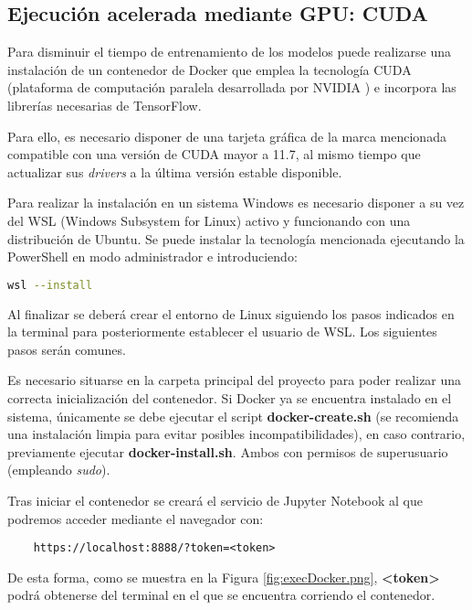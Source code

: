 
\subsection{Ejecución acelerada mediante GPU: CUDA}
Para disminuir el tiempo de entrenamiento de los modelos puede realizarse una instalación de un contenedor de Docker que emplea la tecnología
CUDA (plataforma de computación paralela desarrollada por NVIDIA \cite{misc:wikiCuda}) e incorpora las librerías necesarias de TensorFlow.

Para ello, es necesario disponer de una tarjeta gráfica de la marca mencionada compatible con una versión de CUDA mayor a 11.7, al mismo tiempo
que actualizar sus \textit{drivers} a la última versión estable disponible.

Para realizar la instalación en un sistema Windows es necesario disponer a su vez del WSL (Windows Subsystem for Linux) activo y funcionando con una distribución
de Ubuntu.
Se puede instalar la tecnología mencionada ejecutando la PowerShell en modo administrador e introduciendo:
\begin{lstlisting}[language=Bash]
    wsl --install
\end{lstlisting}

Al finalizar se deberá crear el entorno de Linux siguiendo los pasos indicados en la terminal para posteriormente establecer el usuario
de WSL.
Los siguientes pasos serán comunes.

Es necesario situarse en la carpeta principal del proyecto para poder realizar una correcta inicialización del contenedor. 
Si Docker ya se encuentra instalado en el sistema, únicamente se debe ejecutar el script \textbf{docker-create.sh} (se recomienda una instalación limpia para evitar
posibles incompatibilidades), en caso contrario,
previamente ejecutar \textbf{docker-install.sh}. Ambos con permisos de superusuario (empleando \textit{sudo}).

Tras iniciar el contenedor se creará el servicio de Jupyter Notebook al que podremos acceder mediante el navegador con:
\begin{lstlisting}
    https://localhost:8888/?token=<token>
\end{lstlisting}

De esta forma, como se muestra en la Figura \ref{fig:execDocker.png}, \textbf{<token>} podrá obtenerse del terminal en el que se encuentra corriendo
el contenedor.

